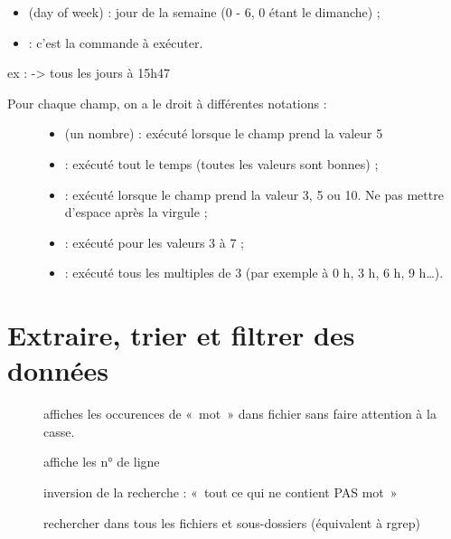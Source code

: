 \documentclass[letterpaper,10pt,french]{sphinxmanual}
\begin{document}
\begin{description}
\begin{itemize}
\item {} 
 (day of week) : jour de la semaine (0 - 6, 0 étant le dimanche) ;

\item {} 
 : c’est la commande à exécuter.

\end{itemize}

ex :  -\textgreater{} tous les jours à 15h47
\begin{description}
\item[{Pour chaque champ, on a le droit à différentes notations :}] \leavevmode\begin{itemize}
\item {} 
 (un nombre) : exécuté lorsque le champ prend la valeur 5

\item {} 
\sphinxcode{\sphinxupquote{*}} : exécuté tout le temps (toutes les valeurs sont bonnes) ;

\item {} 
 : exécuté lorsque le champ prend la valeur 3, 5 ou 10. Ne pas mettre d’espace après la virgule ;

\item {} 
 : exécuté pour les valeurs 3 à 7 ;

\item {} 
 : exécuté tous les multiples de 3 (par exemple à 0 h, 3 h, 6 h, 9 h…).

\end{itemize}

\end{description}

\end{description}


\chapter{Extraire, trier et filtrer des données}
\label{\detokenize{08-trier:extraire-trier-et-filtrer-des-donnees}}\label{\detokenize{08-trier::doc}}\begin{description}
\item[{}] \leavevmode
affiches les occurences de « mot » dans fichier sans faire attention à la casse.

\item[{}] \leavevmode
affiche les n° de ligne

\item[{}] \leavevmode
inversion de la recherche : « tout ce qui ne contient PAS mot »

\item[{}] \leavevmode
rechercher dans tous les fichiers et sous-dossiers (équivalent à rgrep)

\end{description}
\end{document}
